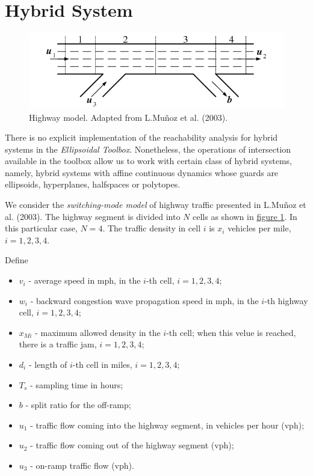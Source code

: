 \documentclass[letterpaper,10pt,english]{sphinxmanual}
\begin{document}
\section{Hybrid System}
\label{chap_examples:hybrid-system}\begin{figure}[htbp]
\centering
\capstart

\includegraphics{hw.png}
\caption{Highway model. Adapted from L.Muñoz et al. (2003).}\label{chap_examples:hwfig}\end{figure}

There is no explicit implementation of the reachability analysis for
hybrid systems in the \emph{Ellipsoidal Toolbox}. Nonetheless, the operations
of intersection available in the toolbox allow us to work with certain
class of hybrid systems, namely, hybrid systems with affine continuous
dynamics whose guards are ellipsoids, hyperplanes, halfspaces or
polytopes.

We consider the \emph{switching-mode model} of highway traffic presented in
L.Muñoz et al. (2003). The highway segment is divided into $N$
cells as shown in \hyperref[chap_examples:hwfig]{figure  \ref*{chap_examples:hwfig}}. In this particular case, $N=4$.
The traffic density in cell $i$ is $x_i$ vehicles per mile,
$i=1,2,3,4$.

Define
\begin{itemize}
\item {} 
$v_i$ - average speed in mph, in the $i$-th cell,
$i=1,2,3,4$;

\item {} 
$w_i$ - backward congestion wave propagation speed in mph, in
the $i$-th highway cell, $i=1,2,3,4$;

\item {} 
$x_{Mi}$ - maximum allowed density in the $i$-th cell;
when this velue is reached, there is a traffic jam,
$i=1,2,3,4$;

\item {} 
$d_i$ - length of $i$-th cell in miles,
$i=1,2,3,4$;

\item {} 
$T_s$ - sampling time in hours;

\item {} 
$b$ - split ratio for the off-ramp;

\item {} 
$u_1$ - traffic flow coming into the highway segment, in
vehicles per hour (vph);

\item {} 
$u_2$ - traffic flow coming out of the highway segment (vph);

\item {} 
$u_3$ - on-ramp traffic flow (vph).

\end{itemize}
\end{document}
